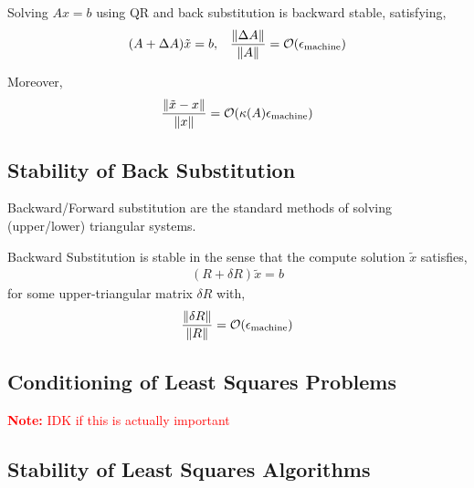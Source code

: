 \documentclass[12pt]{article}
\newcommand{\note}[1]{\textcolor{red}{\textbf{Note:} #1}}
\begin{document}
\begin{theorem}
Solving \( Ax=b \) using QR and back substitution is backward stable, satisfying,
\begin{align*}
    (A+\Delta A)\tilde{x}=b, && \dfrac{\left\lVert\Delta A\right\rVert}{\left\lVert A\right\rVert} = \mathcal{O}(\epsilon_\text{machine})
\end{align*}

Moreover,
\begin{align*}
    \dfrac{\left\lVert\tilde{x} - x\right\rVert}{\left\lVert x\right\rVert} = \mathcal{O}(\kappa(A)\epsilon_\text{machine})
\end{align*}
\end{theorem}

\subsection{Stability of Back Substitution}
Backward/Forward substitution are the standard methods of solving (upper/lower) triangular systems.

\begin{algorithm}
\begin{algorithmic}
\EndFor
\end{algorithmic}
\end{algorithm}

\begin{theorem}
Backward Substitution is stable in the sense that the compute solution \( \tilde{x} \) satisfies,
\begin{align*}
    (R+\delta R)\tilde{x} = b
\end{align*}
for some upper-triangular matrix \( \delta R \) with,
\begin{align*}
    \dfrac{\left\lVert\delta R\right\rVert}{\left\lVert R\right\rVert} = \mathcal{O}(\epsilon_\text{machine})
\end{align*}
\end{theorem}

\subsection{Conditioning of Least Squares Problems}
\note{IDK if this is actually important}

\subsection{Stability of Least Squares Algorithms}
\end{document}
